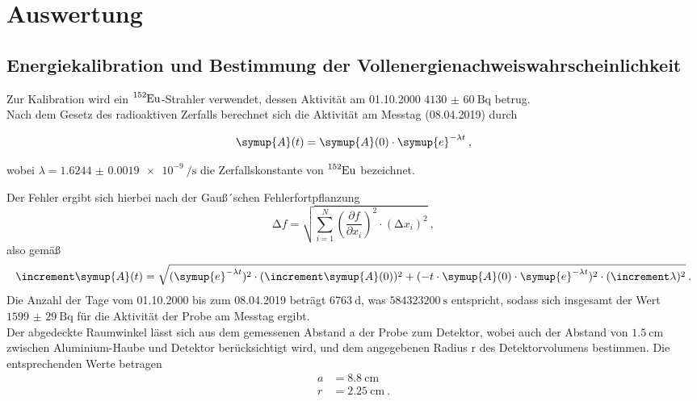 \section{Auswertung}
\label{sec:Auswertung}

\subsection{Energiekalibration und Bestimmung der Vollenergienachweiswahrscheinlichkeit}
Zur Kalibration wird ein $\ce{^{152}Eu}$-Strahler verwendet, dessen Aktivität am 01.10.2000
$\SI{4130(60)}{\becquerel} $ betrug. \\
Nach dem Gesetz des radioaktiven Zerfalls berechnet sich die Aktivität am Messtag (08.04.2019) durch

\begin{equation}
  \symup{A} (t) = \symup{A}(0)\cdot \symup{e}^{-\lambda t} \: ,
\end{equation}

wobei $\lambda=\SI{1.6244(19)e-9}{\per\second}$ \cite{lara} die Zerfallskonstante
von $\ce{^{152}Eu}$ bezeichnet.

Der Fehler ergibt sich hierbei nach der Gauß´schen Fehlerfortpflanzung
\begin{equation}
  \increment f = \sqrt{ \sum_{i=1}^N \left( \frac{\partial f}{\partial x_i}\right)^2
  \cdot (\increment x_i)^2  } \: ,
  \label{eqn:gaus}
\end{equation}
also gemäß
\begin{equation}
  \increment \symup{A} (t) = \sqrt{ (\symup{e}^{-\lambda t})^{2}\cdot (\increment \symup{A}(0))^2
   + (-t\cdot\symup{A}(0)\cdot \symup{e}^{-\lambda t})^2\cdot(\increment \lambda)^2} \: .
\end{equation}
Die Anzahl der Tage vom 01.10.2000 bis zum 08.04.2019 beträgt $\SI{6763}{\day}$, was
$\SI{584323200}{\second}$ entspricht, sodass sich insgesamt der Wert $\SI{1599(29)}{\becquerel} $
für die Aktivität der Probe am Messtag ergibt. \\
Der abgedeckte Raumwinkel lässt sich aus dem gemessenen Abstand a der Probe
zum Detektor, wobei auch der Abstand von $\SI{1.5}{\centi\meter}$ zwischen Aluminium-Haube und Detektor
berücksichtigt wird,
und dem angegebenen Radius r des Detektorvolumens bestimmen. Die entsprechenden Werte
betragen
\begin{align*}
  a &= \SI{8.8}{\centi\meter} \\
  r &= \SI{2.25}{\centi\meter} \: .
\end{align*}

